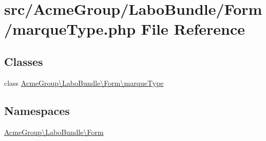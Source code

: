 \hypertarget{marque_type_8php}{\section{src/\+Acme\+Group/\+Labo\+Bundle/\+Form/marque\+Type.php File Reference}
\label{marque_type_8php}
}
\subsection*{Classes}
\begin{DoxyCompactItemize}
\item 
class \hyperlink{class_acme_group_1_1_labo_bundle_1_1_form_1_1marque_type}{Acme\+Group\textbackslash{}\+Labo\+Bundle\textbackslash{}\+Form\textbackslash{}marque\+Type}
\end{DoxyCompactItemize}
\subsection*{Namespaces}
\begin{DoxyCompactItemize}
\item 
 \hyperlink{namespace_acme_group_1_1_labo_bundle_1_1_form}{Acme\+Group\textbackslash{}\+Labo\+Bundle\textbackslash{}\+Form}
\end{DoxyCompactItemize}
